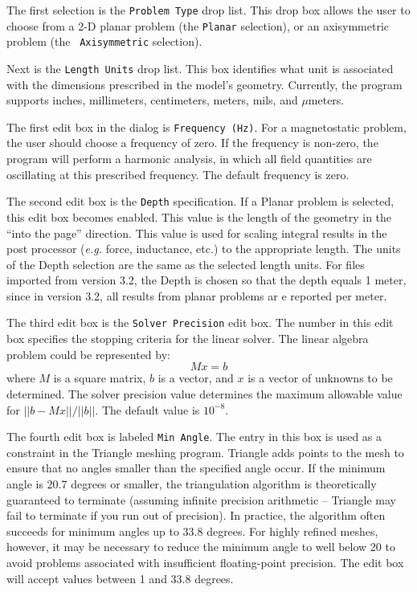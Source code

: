 \documentclass[12pt]{report}
\begin{document}
The first selection is the {\tt Problem Type} drop list.  This
drop box allows the user to choose from a 2-D planar problem (the
{\tt Planar} selection), or an axisymmetric problem (the {\tt
Axisymmetric} selection).

Next is the {\tt Length Units} drop list.  This box identifies what
unit is associated with the dimensions prescribed in the model's
geometry.  Currently, the program supports inches, millimeters,
centimeters, meters, mils, and $\mu$meters.

The first edit box in the dialog is {\tt Frequency (Hz)}.  For a
magnetostatic problem, the user should choose a frequency of zero.
If the frequency is non-zero, the program will perform a harmonic
analysis, in which all field quantities are oscillating at this
prescribed frequency.  The default frequency is zero.

The second edit box is the {\tt Depth} specification.  If a Planar
problem is selected, this edit box becomes enabled.  This value is
the length of the geometry in the ``into the page'' direction.
This value is used for scaling integral results in the post
processor ({\em e.g.} force, inductance, etc.) to the appropriate
length.  The units of the Depth selection are the same as the
selected length units.  For files imported from version 3.2, the
Depth is chosen so that the depth equals 1 meter, since in version
3.2, all results from planar problems ar e reported per meter.

The third edit box is the {\tt Solver Precision} edit box. The number in this edit box
specifies the stopping criteria for the linear solver.  The linear algebra
problem could be represented by:
\begin{displaymath}
M x=b
\end{displaymath} where $M$ is a square matrix, $b$ is a vector, and $x$ is
a vector of unknowns to be determined.  The solver precision value
determines the maximum allowable value for $||b-M x||/||b||$.  The
default value is $10^{-8}$.

The fourth edit box is labeled {\tt Min Angle}.  The entry in this box is used as a
constraint in the Triangle meshing program.  Triangle adds points to the mesh to
ensure that no angles smaller than the specified angle occur. If the minimum angle
is 20.7 degrees or smaller, the triangulation algorithm is theoretically guaranteed to
terminate (assuming infinite precision arithmetic -- Triangle may
fail to terminate if you run out of precision).  In practice, the
algorithm often succeeds for minimum angles up to 33.8 degrees.
For highly refined meshes, however, it may be necessary to reduce
the minimum angle to well below 20 to avoid problems associated
with insufficient floating-point precision.  The edit box will accept
values between 1 and 33.8 degrees.
\end{document}

